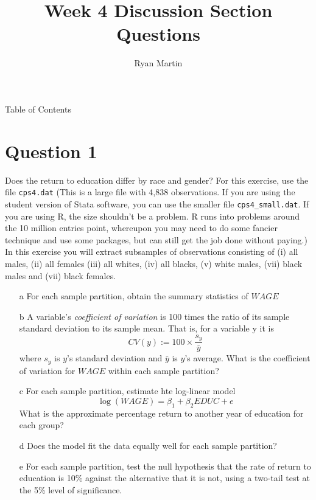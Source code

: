 \documentclass[xcolor={dvipsnames}]{beamer}
\title{ Week 4 Discussion Section Questions }
\author{Ryan Martin}
\begin{document}
	\maketitle


	\begin{frame}{Table of Contents}
		\tableofcontents
	\end{frame}

	\section{Question 1}
	
\begin{frame}[allowframebreaks]{4.15}
	Does the return to education differ by race and gender? For this exercise, use the file \texttt{cps4.dat} (This is a large file with 4,838 observations. If you are using the student version of Stata software, you can use the smaller file \texttt{cps4\_small.dat}. If you are using R, the size shouldn't be a problem. R runs into problems around the 10 million entries point, whereupon you may need to do some fancier technique and use some packages, but can still get the job done without paying.) In this exercise you will extract subsamples of observations consisting of (i) all males, (ii) all females (iii) all whites, (iv) all blacks, (v) white males, (vii) black males and (vii) black females.
	
	\begin{itemize}
	\item[a] For each sample partition, obtain the summary statistics of $WAGE$	

	\item[b] A variable's \textit{coefficient of variation} is 100 times the ratio of its sample standard deviation to its sample mean. That is, for a variable y it is $$CV(y):= 100 \times \frac{s_y}{\bar{y}}$$ where $s_y$ is $y$'s standard deviation and $\bar{y}$ is $y$'s average. What is the coefficient of variation for $WAGE$ within each sample partition?
	
	\item[c] For each sample partition, estimate hte log-linear model $$\log(WAGE) = \beta_1 + \beta_2 EDUC + e$$ What is the approximate percentage return to another year of education for each group?

	\item[d] Does the model fit the data equally well for each sample partition?
	
	\item[e] For each sample partition, test the null hypothesis that the rate of return to education is 10\% against the alternative that it is not, using a two-tail test at the 5\% level of significance.
\end{itemize}

\end{frame}
\end{document}
